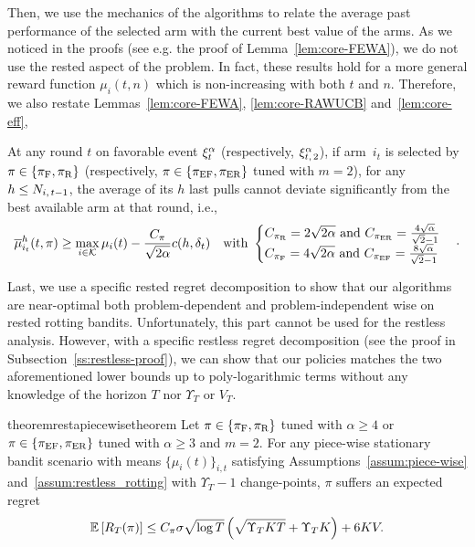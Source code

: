 Then, we use the mechanics of the algorithms to relate the average past performance of the selected arm with the current best value of the arms. As we noticed in the proofs (see e.g. the proof of Lemma~\ref{lem:core-FEWA}), we do not use the rested aspect of the problem. In fact, these results hold for a more general reward function $\mu_i(t,n)$ which is non-increasing with both $t$ and $n$. Therefore, we also restate Lemmas~\ref{lem:core-FEWA}, \ref{lem:core-RAWUCB} and~\ref{lem:core-eff},
\begin{lemma}
\label{lem:core-full}
At any round $t$ on favorable event $\xi^\alpha_t$ (respectively, $\xi^\alpha_{t,\, 2}$), if arm~$i_{t}$ is selected by $\pi \in \left\{\pi_{\rm F}, \pi_{\rm R}\right\}$ (respectively, $\pi \in \left\{\normalfont \pi_{\rm EF}, \normalfont \pi_{\rm ER}\right\} $ tuned with $m=2$), for any $h \leq N_{i,\,t-1}$,  the average of its $h$ last pulls cannot deviate significantly from the best available arm at that round, i.e.,
\begin{equation*}
\overline{\mu}^{h}_{i_t}(t,\pi) \geq \max_{i \in \mathcal{K}} \mu_{i}(t)- \frac{C_\pi}{\sqrt{2\alpha}} c(h, \delta_t) \quad \text{with } 
\begin{cases}
C_{\pi_{\rm R}} = 2\sqrt{2\alpha} \text{ and } C_{\normalfont \pi_{\rm ER}} = \frac{4\sqrt{\alpha}}{\sqrt{2}-1}\\
C_{\pi_{\rm F}} = 4\sqrt{2\alpha} \text{ and }C_{\normalfont \pi_{\rm EF}} = \frac{8\sqrt{\alpha}}{\sqrt{2}-1}
\end{cases}\cdot
\end{equation*}
\end{lemma}
Last, we use a specific rested regret decomposition to show that our algorithms are near-optimal both problem-dependent and problem-independent wise on rested rotting bandits. Unfortunately, this part cannot be used for the restless analysis. However, with a specific restless regret decomposition (see the proof in Subsection~\ref{ss:restless-proof}), we can show that our policies matches the two aforementioned lower bounds up to poly-logarithmic terms without any knowledge of the horizon $T$ nor $\Upsilon_T$ or $V_T$.
%
\begin{restatable}{theorem}{restapiecewisetheorem}
\label{th:piecewise-minimax}
Let $\pi \in \left\{ \pi_{\rm F}, \pi_{\rm R}\right\}$ tuned with $\alpha \geq 4$ or $\pi \in \left\{ \normalfont \pi_{\rm EF}, \normalfont \pi_{\rm ER}\right\}$ tuned with $\alpha \geq 3$ and $m=2$. For any piece-wise stationary bandit scenario with means $\{\mu_i(t)\}_{i,t}$ satisfying Assumptions~\ref{assum:piece-wise} and~\ref{assum:restless_rotting}  with $\Upsilon_T-1$ change-points, $\pi$  suffers an expected regret\,
\[
\mathbb{E}\left[R_T(\pi)\right] \leq C_\pi \sigma \sqrt{\log{T}} \left( \sqrt{\Upsilon_T KT} + \Upsilon_T K\right) + 6KV.
\]
\end{restatable}
